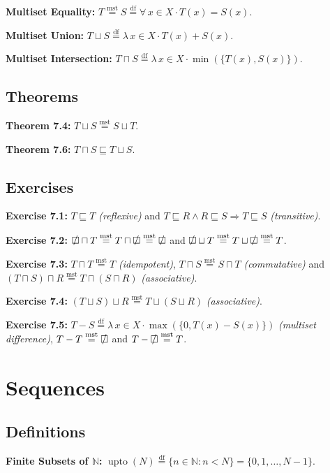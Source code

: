 \documentclass[12pt]{article}
\newcommand{\dfeq}{\stackrel{\text{df}}{=}}
\newcommand{\msteq}{\stackrel{\text{mst}}{=}}
\newcommand{\sqemptyset}{\ensurestackMath{\stackinset{c}{}{c}{}{/}{\square}}}
\DeclareMathOperator{\jupto}{upto}
\theoremstyle{plain}
\begin{document}
\textbf{Multiset Equality:} $T \msteq S \dfeq \forall\, x \in X
\cdot T(x) = S(x)$.

\textbf{Multiset Union:} $T \sqcup S \dfeq \lambda\, x \in X
\cdot T(x) + S(x)$.

\textbf{Multiset Intersection:} $T \sqcap S \dfeq \lambda\, x
\in X \cdot \min(\{T(x), S(x)\})$.

\subsection{Theorems}

\textbf{Theorem 7.4:} $T \sqcup S \msteq S \sqcup T$.

\textbf{Theorem 7.6:} $T \sqcap S \sqsubseteq T \sqcup S$.

\subsection{Exercises}

\textbf{Exercise 7.1:} $T \sqsubseteq T$ \textit{(reflexive)}
and $T \sqsubseteq R \land R \sqsubseteq S \Rightarrow T
\sqsubseteq S$ \textit{(transitive)}.

\textbf{Exercise 7.2:} $\sqemptyset \sqcap T \msteq T \sqcap
\sqemptyset \msteq \sqemptyset$ and $\sqemptyset \sqcup T \msteq
T \sqcup \sqemptyset \msteq T$.

\textbf{Exercise 7.3:} $T \sqcap T \msteq T$
\textit{(idempotent)}, $T \sqcap S \msteq S \sqcap T$
\textit{(commutative)} and $(T \sqcap S) \sqcap R \msteq T
\sqcap (S \sqcap R)$ \textit{(associative)}.

\textbf{Exercise 7.4:} $(T \sqcup S) \sqcup R \msteq T \sqcup (S
\sqcup R)$ \textit{(associative)}.

\textbf{Exercise 7.5:} $T - S \dfeq \lambda\, x \in X \cdot
\max(\{0, T(x) - S(x)\})$ \textit{(multiset difference)}, $T - T
\msteq \sqemptyset$ and $T - \sqemptyset \msteq T$.

\section{Sequences}

\subsection{Definitions}

\textbf{Finite Subsets of $\mathbb{N}$:} $\jupto(N)
\dfeq \{n \in \mathbb{N} : n < N\} = \{0, 1, \ldots, N - 1\}$.
\end{document}
